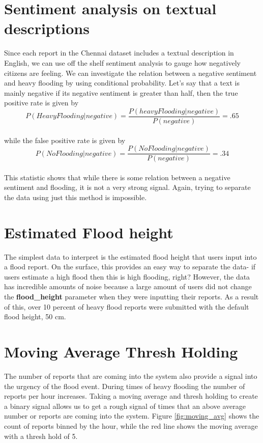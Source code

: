 \section{Sentiment analysis on textual descriptions}
Since each report in the Chennai dataset includes a textual description in English, 
we can use off the shelf sentiment analysis to gauge how
negatively citizens are feeling. We can investigate the relation between a negative sentiment and 
heavy flooding by using conditional probability. Let's say that a text is mainly negative if 
its negative sentiment is greater than half, then the true positive rate is given by 
\\
$$P( Heavy Flooding | negative) =  \frac{P(heavy Flooding | negative)}{P(negative)} = .65 $$
\\
while the false positive rate is given by
\\
$$P( No Flooding | negative) =  \frac{P(No Flooding | negative)}{P(negative)} = .34 $$
\\

This statistic shows that while there is some relation between a negative sentiment and flooding, it is not 
a very strong signal. Again, trying to separate the data using just this method is impossible.

\section{Estimated Flood height}
The simplest data to interpret is the estimated flood height that users input into a flood report. 
On the surface, this provides an easy way to separate the data- if users estimate a high flood then 
this is high flooding, right? However, the data has incredible amounts of noise because a 
large amount of users 
did not change the \textbf{flood\_height} parameter when they were inputting their reports. As 
a result of this, over 10 percent of heavy flood reports were submitted with the default flood height, 50 cm.

\section{Moving Average Thresh Holding}
The number of reports that are coming into the system also 
provide a signal into the urgency of the flood
event. During times of heavy flooding the 
number of reports per hour increases. Taking a moving average and 
thresh holding to create a binary signal allows us to get a 
rough signal of times that an above average 
number or reports are coming into the system. 
Figure \ref{fig:moving_avg} shows the count of reports binned
by the hour, while the red line shows the moving average with a thresh hold of 5.

